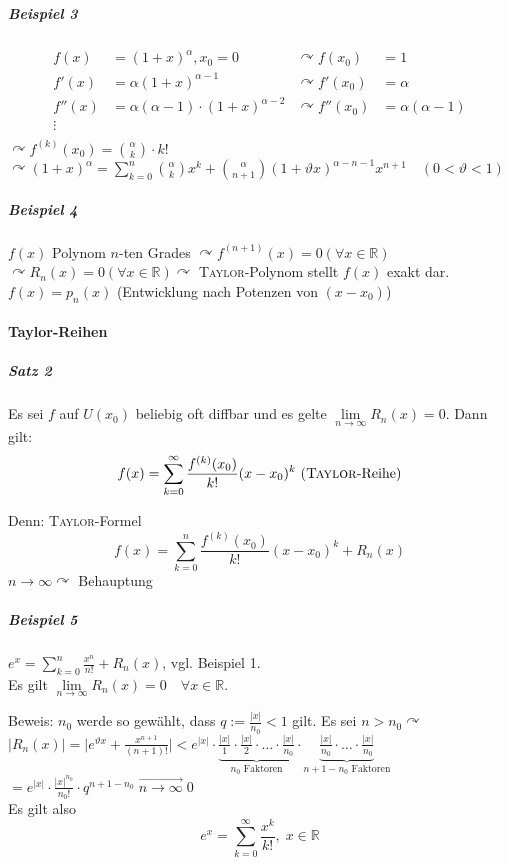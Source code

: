 \documentclass[a4paper]{scrartcl}
\begin{document}
\subparagraph{Beispiel 3} \begin{align*}
f(x) &= (1+x)^\alpha, x_0 = 0 &\curvearrowright f(x_0) &= 1\\
f'(x) &= \alpha (1+x)^{\alpha -1} &\curvearrowright f'(x_0) &= \alpha\\
f''(x) &= \alpha(\alpha-1)\cdot (1+x)^{\alpha-2} &\curvearrowright f''(x_0) &= \alpha (\alpha-1)\\
\vdots\\
\end{align*}
$\curvearrowright f^{(k)} (x_0) = \binom{\alpha}{k} \cdot k!$\\
$\curvearrowright (1+x)^\alpha = \sum\limits_{k=0}^{n} \binom{\alpha}{k} x^k + \binom{\alpha}{n+1} (1+\vartheta x)^{\alpha - n -1} x^{n+1} \quad (0 < \vartheta < 1)$

\subparagraph{Beispiel 4} $f(x)$ Polynom $n$-ten Grades $\curvearrowright f^{(n+1)} (x) = 0 (\forall x \in \mathbb{R})$\\
$\curvearrowright R_n(x) = 0(\forall x \in \mathbb{R}) \curvearrowright$ \textsc{Taylor}-Polynom stellt $f(x)$ exakt dar.\\
$f(x) = p_n(x)$ (Entwicklung nach Potenzen von $(x-x_0)$)

\paragraph{Taylor-Reihen}
\subparagraph{Satz 2} Es sei $f$ auf $U(x_0)$ beliebig oft diffbar und es gelte $\lim\limits_{n \to \infty} R_n(x) = 0$. Dann gilt:
\[f(x) = \sum\limits_{k=0}^{\infty} \frac{f^{(k)} (x_0)}{k!} (x-x_0)^k \text{ (\textsc{Taylor}-Reihe)}\]

Denn: \textsc{Taylor}-Formel
\[ f(x) = \sum\limits_{k=0}^{n} \frac{f^{(k)}(x_0)}{k!} (x-x_0)^k + R_n(x) \]
$n\to \infty \curvearrowright$ Behauptung

\subparagraph{Beispiel 5} $e^x = \sum\limits_{k=0}^{n} \frac{x^n}{n!} + R_n(x)$, vgl. Beispiel 1.\\
Es gilt $\lim\limits_{n \to \infty} R_n (x) = 0 \quad \forall x \in \mathbb{R}$.

Beweis: $n_0$ werde so gewählt, dass $q:= \frac{\lvert x \rvert}{n_0} < 1$ gilt. Es sei $n>n_0 \curvearrowright$\\
$\lvert R_n(x) \rvert = \lvert e^{\vartheta x} + \frac{x^{n+1}}{(n+1)!} \rvert < e^{\lvert x \rvert} \cdot \underbrace{\frac{\lvert x \rvert}{1} \cdot \frac{\lvert x \rvert}{2} \cdot \dots \cdot \frac{\lvert x \rvert}{n_0}}_{n_0 \text{ Faktoren}} \cdot \underbrace{\frac{\lvert x \rvert}{n_0} \cdot \dots  \cdot \frac{\lvert x \rvert}{n_0}}_{n+1 - n_0 \text{ Faktoren}}$\\
$=e^{\lvert x \rvert} \cdot \frac{\lvert x \rvert^{n_0}}{n_0!} \cdot q^{n+1-n_0} \; \overrightarrow{n\to \infty} \; 0$\\
Es gilt also \[e^x = \sum\limits_{k=0}^{\infty} \frac{x^k}{k!}, \; x \in\mathbb{R}\]
\end{document}
